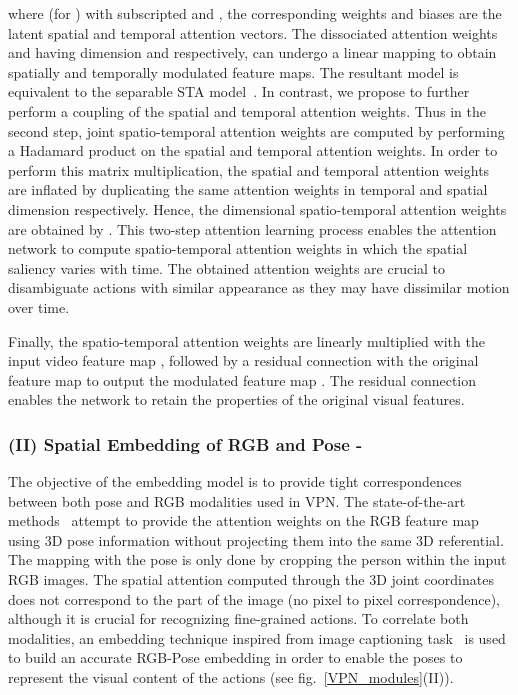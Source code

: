 \documentclass[runningheads]{llncs}
\begin{document}
where  (for ) with subscripted  and , the corresponding weights and biases are the latent spatial and temporal attention vectors.
The dissociated attention weights  and  having dimension  and  respectively, can undergo a linear mapping to obtain spatially and temporally modulated feature maps. The resultant model is equivalent to the separable STA model~\cite{STA_iccv}. In contrast, we propose to further perform a coupling of the spatial and temporal attention weights. 
Thus in the second step, joint spatio-temporal attention weights are computed by performing a Hadamard product on the spatial and temporal attention weights. In order to perform this matrix multiplication, the spatial and temporal attention weights are inflated by duplicating the same attention weights in temporal and spatial dimension respectively. Hence, the  dimensional spatio-temporal attention weights  are obtained by . This two-step attention learning process enables the attention network to compute spatio-temporal attention weights in which the spatial saliency varies with time. The obtained attention weights are crucial to disambiguate actions with similar appearance as they may have dissimilar motion over time. 

 Finally, the spatio-temporal attention weights  are linearly multiplied with the input video feature map , followed by a residual connection with the original feature map  to output the modulated feature map . The residual connection enables the network to retain the properties of the original visual features.
\subsubsection{(II) Spatial Embedding of RGB and Pose - }
The objective of the embedding model is to provide tight correspondences between both pose and RGB modalities used in VPN. The state-of-the-art methods~\cite{spatial-i3d,STA_iccv} attempt to provide the attention weights on the RGB feature map using 3D pose information without projecting them into the same 3D referential. The mapping with the pose is only done by cropping the person within the input RGB images.
The spatial attention computed through the 3D joint coordinates does not correspond to the part of the image (no pixel to pixel correspondence), although it is crucial for recognizing fine-grained actions. To correlate both modalities, an embedding technique inspired from image captioning task~\cite{text_video_embedding,joint_modelling_captioning} is used to build an accurate RGB-Pose embedding in order to enable the poses to represent the visual content of the actions (see fig.~\ref{VPN_modules}(II)).
\end{document}
